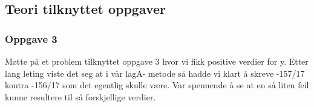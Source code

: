 \subsection{Teori tilknyttet oppgaver}
\subsubsection{Oppgave 3}
Møtte på et problem tilknyttet oppgave 3 hvor vi fikk positive verdier for y. Etter lang leting viste det seg at i vår lagA- metode så hadde vi klart å skreve -157/17 kontra -156/17 som det egentlig skulle være. Var spennende å se at en så liten feil kunne resultere til så forskjellige verdier. 